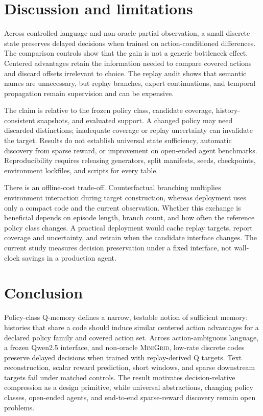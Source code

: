 \documentclass{article}
\def\minigrid{\textsc{MiniGrid}}
\def\qwen{Qwen2.5}
\begin{document}
\section{Discussion and limitations}
Across controlled language and non-oracle partial observation, a small discrete state preserves delayed decisions when trained on action-conditioned differences. The comparison controls show that the gain is not a generic bottleneck effect. Centered advantages retain the information needed to compare covered actions and discard offsets irrelevant to choice. The replay audit shows that semantic names are unnecessary, but replay branches, expert continuations, and temporal propagation remain supervision and can be expensive.

The claim is relative to the frozen policy class, candidate coverage, history-consistent snapshots, and evaluated support. A changed policy may need discarded distinctions; inadequate coverage or replay uncertainty can invalidate the target. Results do not establish universal state sufficiency, automatic discovery from sparse reward, or improvement on open-ended agent benchmarks. Reproducibility requires releasing generators, split manifests, seeds, checkpoints, environment lockfiles, and scripts for every table.

There is an offline-cost trade-off. Counterfactual branching multiplies environment interaction during target construction, whereas deployment uses only a compact code and the current observation. Whether this exchange is beneficial depends on episode length, branch count, and how often the reference policy class changes. A practical deployment would cache replay targets, report coverage and uncertainty, and retrain when the candidate interface changes. The current study measures decision preservation under a fixed interface, not wall-clock savings in a production agent.

\section{Conclusion}
Policy-class Q-memory defines a narrow, testable notion of sufficient memory: histories that share a code should induce similar centered action advantages for a declared policy family and covered action set. Across action-ambiguous language, a frozen \qwen{} interface, and non-oracle \minigrid{}, low-rate discrete codes preserve delayed decisions when trained with replay-derived Q targets. Text reconstruction, scalar reward prediction, short windows, and sparse downstream targets fail under matched controls. The result motivates decision-relative compression as a design primitive, while universal abstractions, changing policy classes, open-ended agents, and end-to-end sparse-reward discovery remain open problems.
\end{document}

